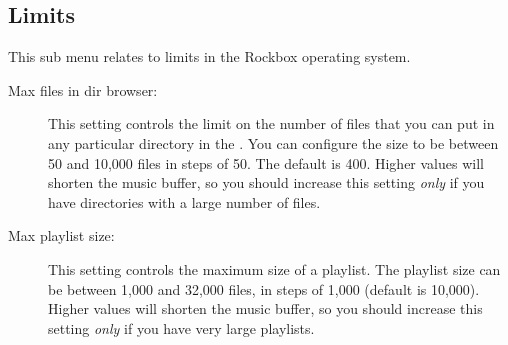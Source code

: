 
\subsection{Limits}
This sub menu relates to limits in the Rockbox operating system.
  \begin{description}
    \item [Max files in dir browser: ]This setting controls the limit on
    the number of files that you can put in any particular directory in the
    . You can configure the size to be between 50 and
    10,000 files in steps of 50. The default is 400. Higher values will shorten
    the music buffer, so you should increase this setting \emph{only} if you have
    directories with a large number of files.

    \item [Max playlist size: ]This setting controls the maximum size of 
    a playlist. The playlist size can be between 1,000 and 32,000 files,
    in steps of 1,000 (default is 10,000). Higher values will shorten the
    music buffer, so you should increase this setting \emph{only} if you
    have very large playlists.
  \end{description}

